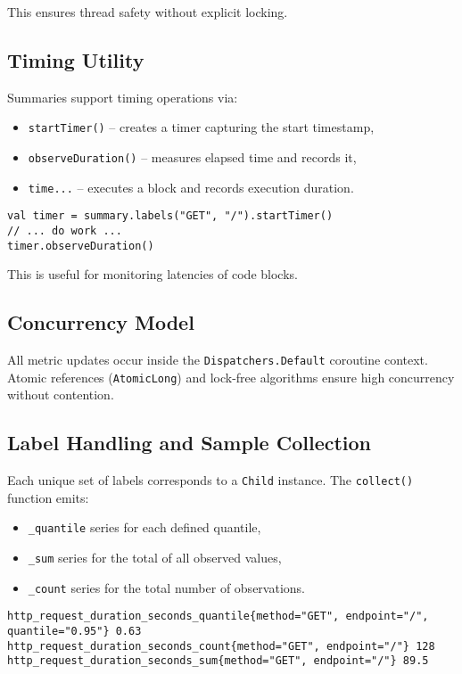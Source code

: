 This ensures thread safety without explicit locking.

\subsection{Timing Utility}

Summaries support timing operations via:
\begin{itemize}
\item \texttt{startTimer()} – creates a timer capturing the start timestamp,
\item \texttt{observeDuration()} – measures elapsed time and records it,
\item \texttt{time{...}} – executes a block and records execution duration.
\end{itemize}

\begin{verbatim}
val timer = summary.labels("GET", "/").startTimer()
// ... do work ...
timer.observeDuration()
\end{verbatim}

This is useful for monitoring latencies of code blocks.

\subsection{Concurrency Model}

All metric updates occur inside the \texttt{Dispatchers.Default} coroutine context. Atomic references (\texttt{AtomicLong}) and lock-free algorithms ensure high concurrency without contention.

\subsection{Label Handling and Sample Collection}

Each unique set of labels corresponds to a \texttt{Child} instance. The \texttt{collect()} function emits:

\begin{itemize}
    \item \texttt{\_quantile} series for each defined quantile, 
    \item \texttt{\_sum} series for the total of all observed values, 
    \item \texttt{\_count} series for the total number of observations. 
\end{itemize}


\begin{verbatim}
http_request_duration_seconds_quantile{method="GET", endpoint="/", quantile="0.95"} 0.63
http_request_duration_seconds_count{method="GET", endpoint="/"} 128
http_request_duration_seconds_sum{method="GET", endpoint="/"} 89.5
\end{verbatim}

